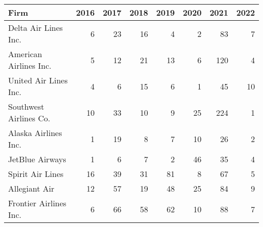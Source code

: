 
\begin{tabular}{lrrrrrrr}
\toprule
Firm & 2016 & 2017 & 2018 & 2019 & 2020 & 2021 & 2022\\
\midrule
Delta Air Lines Inc. & 6 & 23 & 16 & 4 & 2 & 83 & 7\\
American Airlines Inc. & 5 & 12 & 21 & 13 & 6 & 120 & 4\\
United Air Lines Inc. & 4 & 6 & 15 & 6 & 1 & 45 & 10\\
Southwest Airlines Co. & 10 & 33 & 10 & 9 & 25 & 224 & 1\\
Alaska Airlines Inc. & 1 & 19 & 8 & 7 & 10 & 26 & 2\\
\addlinespace
JetBlue Airways & 1 & 6 & 7 & 2 & 46 & 35 & 4\\
Spirit Air Lines & 16 & 39 & 31 & 81 & 8 & 67 & 5\\
Allegiant Air & 12 & 57 & 19 & 48 & 25 & 84 & 9\\
Frontier Airlines Inc. & 6 & 66 & 58 & 62 & 10 & 88 & 7\\
\bottomrule
\end{tabular}
